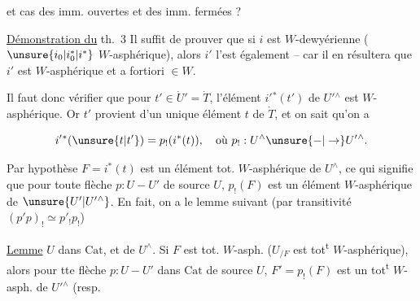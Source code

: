 et  cas des imm. ouvertes et des imm. fermées ?

\uline{Démonstration du} th.~3  Il suffit de prouver que si $i$ est $W$-dewyérienne ( $\unsure{i_0|i^*_0|i^*}$  $W$-asphérique), alors $i'$ l'est également -- car il en résultera que $i'$ est $W$-asphérique et a fortiori $\in W$.

Il faut donc vérifier que pour  $t'\in\dot U'=\dot T$, l'élément $i'{}^*(t')$  de $U'{}^\wedge$ est  $W$-asphérique. Or $t'$ provient d'un unique élément $t$ de $\dot T$, et on sait qu'on a

\[
i'{}^*(\unsure{t|t'})=p_!(i^*(t)),\quad\text{où }p_!:U^\wedge\unsure{-|\to}U'{}^\wedge .
\]

Par hypothèse $F=i^*(t)$ est un élément tot. $W$-asphérique de $U^\wedge$, ce qui signifie que pour toute flèche $p:U-U'$  de source $U$, $p_!(F)$ est un élément $W$-asphérique de $\unsure{U'|U'{}^\wedge}$. En fait, on a le lemme suivant (par transitivité $(p'p)_!\simeq p'_!p_!$)

\uline{Lemme}  $U$ dans $\mathrm{Cat}$, et  de $U^\wedge$. Si $F$ est tot. $W$-asph.  ($U_{/F}$ est tot\textsuperscript{t} $W$-asphérique), alors pour tte flèche $p:U-U'$ dans $\mathrm{Cat}$ de source $U$, $F'=p_!(F)$ est un  tot\textsuperscript{t} $W$-asph. de $U'{}^\wedge$ (resp.
